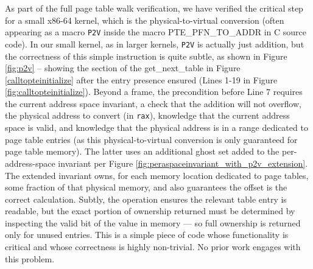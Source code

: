 As part of the full page table walk verification, we have verified the critical step for a small x86-64 kernel, which is the physical-to-virtual
conversion (often appearing as a macro \texttt{P2V} inside the macro \textsf{ PTE\_PFN\_TO\_ADDR} in C source code). In our small kernel, as in larger kernels, \texttt{P2V} is actually just addition,
but the correctness of this simple instruction is quite subtle, as shown in Figure \ref{fig:p2v} -- showing the section of the \textsf{get\_next\_table} in Figure \ref{calltopteinitialize} after the entry presence ensured (Lines 1-19 in Figure \ref{fig:calltopteinitialize}).
Beyond a frame, the precondition before Line 7 requires the current address space invariant, a check that the addition will not overflow, the physical address to convert
(in \lstinline|rax|), knowledge that the current address space is valid, and knowledge that the physical address is in a range dedicated
to page table entries (as this physical-to-virtual conversion is only guaranteed for page table memory). 
The latter uses an additional ghost set added to the per-address-space
invariant per Figure \ref{fig:peraspaceinvariant_with_p2v_extension}. The extended invariant owns, for each memory location dedicated to page tables, some fraction of
that physical memory, and also guarantees the offset is the correct calculation.
Subtly, the operation ensures the relevant table entry is readable, but the exact portion of ownership returned must be determined by inspecting the valid bit
of the value in memory --- so full ownership is returned only for unused entries.
This is a simple piece of code whose functionality is critical and whose correctness is highly non-trivial. No prior work engages with this problem.

